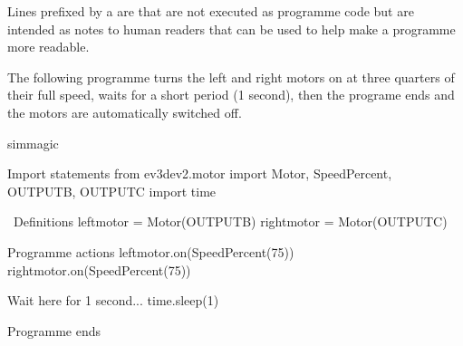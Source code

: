 \documentclass[letterpaper,10pt,english]{sphinxmanual}
\begin{document}
\begin{sphinxVerbatim}[commandchars=\\\{\}]
      
 

  
  



\end{sphinxVerbatim}

Lines prefixed by a \sphinxcode{\sphinxupquote{\#}} are  that are not executed as programme code but are intended as notes to human readers that can be used to help make a programme more readable.

The following programme turns the left and right motors on at three quarters of their full speed, waits for a short period (1 second), then the programe ends and the motors are automatically switched off.

{
\begin{sphinxVerbatim}[commandchars=\\\{\}]
\llap{\color{nbsphinxin}[ ]:\,\hspace{\fboxrule}\hspace{\fboxsep}}\PYGZpc{}\PYGZpc{}sim\PYGZus{}magic

\PYGZsh{} Import statements
from ev3dev2.motor import Motor, SpeedPercent, OUTPUT\PYGZus{}B, OUTPUT\PYGZus{}C
import time

\PYGZsh{} Definitions
left\PYGZus{}motor = Motor(OUTPUT\PYGZus{}B)
right\PYGZus{}motor = Motor(OUTPUT\PYGZus{}C)

\PYGZsh{} Programme actions
left\PYGZus{}motor.on(SpeedPercent(75))
right\PYGZus{}motor.on(SpeedPercent(75))

\PYGZsh{} Wait here for 1 second...
time.sleep(1)

\PYGZsh{} Programme ends
\end{sphinxVerbatim}
}
\end{document}
